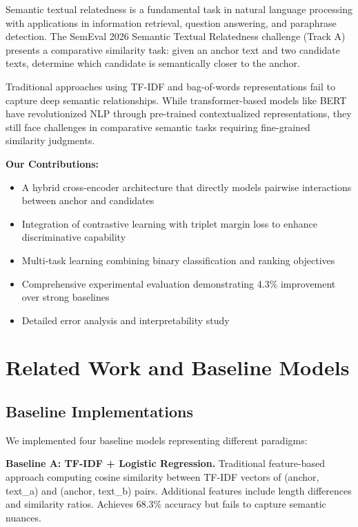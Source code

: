 \documentclass[conference]{IEEEtran}
\begin{document}
Semantic textual relatedness is a fundamental task in natural language processing with applications in information retrieval, question answering, and paraphrase detection. The SemEval 2026 Semantic Textual Relatedness challenge (Track A) presents a comparative similarity task: given an anchor text and two candidate texts, determine which candidate is semantically closer to the anchor.

Traditional approaches using TF-IDF and bag-of-words representations fail to capture deep semantic relationships. While transformer-based models like BERT~\cite{devlin2018bert} have revolutionized NLP through pre-trained contextualized representations, they still face challenges in comparative semantic tasks requiring fine-grained similarity judgments.

\textbf{Our Contributions:}
\begin{itemize}
    \item A hybrid cross-encoder architecture that directly models pairwise interactions between anchor and candidates
    \item Integration of contrastive learning with triplet margin loss to enhance discriminative capability
    \item Multi-task learning combining binary classification and ranking objectives
    \item Comprehensive experimental evaluation demonstrating 4.3\% improvement over strong baselines
    \item Detailed error analysis and interpretability study
\end{itemize}

\section{Related Work and Baseline Models}

\subsection{Baseline Implementations}

We implemented four baseline models representing different paradigms:

\textbf{Baseline A: TF-IDF + Logistic Regression.} Traditional feature-based approach computing cosine similarity between TF-IDF vectors of (anchor, text\_a) and (anchor, text\_b) pairs. Additional features include length differences and similarity ratios. Achieves 68.3\% accuracy but fails to capture semantic nuances.
\end{document}
